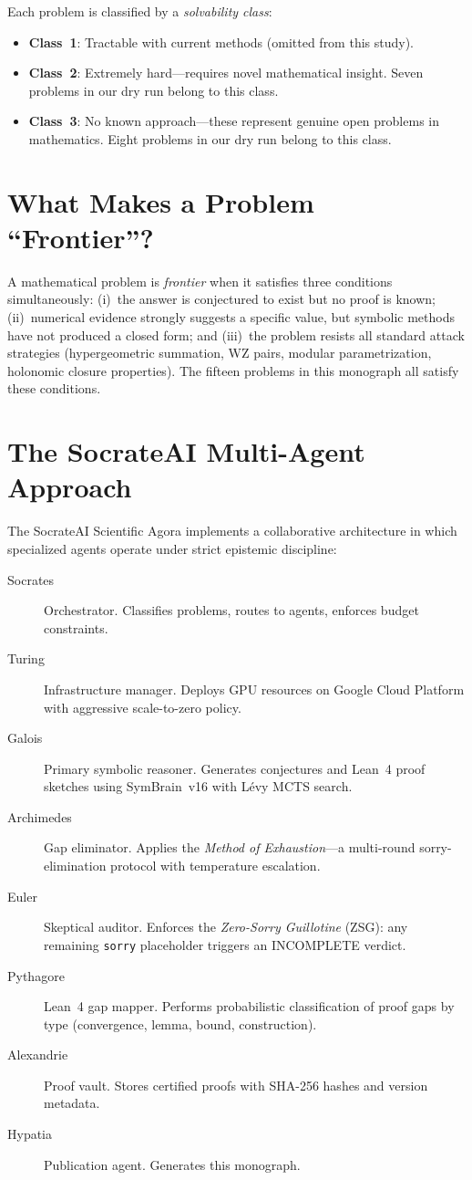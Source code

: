 \documentclass[12pt,a4paper]{report}
\theoremstyle{plain}
\theoremstyle{definition}
\theoremstyle{remark}
\newcommand{\sorry}{\textcolor{sorryred}{\texttt{sorry}}}
\begin{document}
Each problem is classified by a \emph{solvability class}:
\begin{itemize}
  \item \textbf{Class~1}: Tractable with current methods (omitted from this study).
  \item \textbf{Class~2}: Extremely hard—requires novel mathematical insight. Seven
        problems in our dry run belong to this class.
  \item \textbf{Class~3}: No known approach—these represent genuine open problems in
        mathematics. Eight problems in our dry run belong to this class.
\end{itemize}

\section{What Makes a Problem ``Frontier''?}

A mathematical problem is \emph{frontier} when it satisfies three conditions
simultaneously: (i)~the answer is conjectured to exist but no proof is known;
(ii)~numerical evidence strongly suggests a specific value, but symbolic methods
have not produced a closed form; and (iii)~the problem resists all standard
attack strategies (hypergeometric summation, WZ pairs, modular parametrization,
holonomic closure properties). The fifteen problems in this monograph all satisfy
these conditions.

\section{The SocrateAI Multi-Agent Approach}

The SocrateAI Scientific Agora implements a collaborative architecture in which
specialized agents operate under strict epistemic discipline:

\begin{description}
  \item[Socrates] Orchestrator. Classifies problems, routes to agents, enforces
    budget constraints.
  \item[Turing] Infrastructure manager. Deploys GPU resources on Google Cloud
    Platform with aggressive scale-to-zero policy.
  \item[Galois] Primary symbolic reasoner. Generates conjectures and Lean~4 proof
    sketches using SymBrain~v16 with Lévy MCTS search.
  \item[Archimedes] Gap eliminator. Applies the \emph{Method of Exhaustion}—a
    multi-round sorry-elimination protocol with temperature escalation.
  \item[Euler] Skeptical auditor. Enforces the \emph{Zero-Sorry Guillotine} (ZSG):
    any remaining \sorry{} placeholder triggers an INCOMPLETE verdict.
  \item[Pythagore] Lean~4 gap mapper. Performs probabilistic classification of
    proof gaps by type (convergence, lemma, bound, construction).
  \item[Alexandrie] Proof vault. Stores certified proofs with SHA-256 hashes
    and version metadata.
  \item[Hypatia] Publication agent. Generates this monograph.
\end{description}
\end{document}
